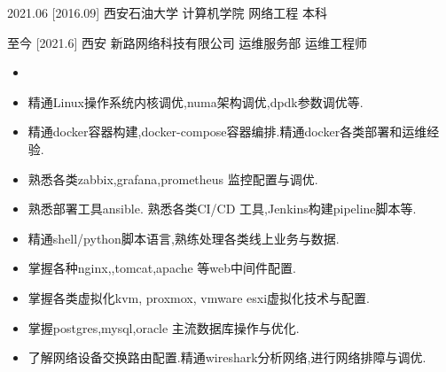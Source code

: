 \documentclass[zh]{resume}
\begin{document}
\begin{educations}
  \education%
    {2021.06}%
    [2016.09]%
    {西安石油大学}%
    {计算机学院}%
    {网络工程}%
    {本科}
\end{educations}
\begin{educations}
  \education%
    {至今}%
    [2021.6]%
    {西安}%
    {新路网络科技有限公司}%
    {运维服务部}%
    {运维工程师}
\end{educations}
\begin{itemize}
  \item {}
\end{itemize}
\begin{itemize}
  \item 精通Linux操作系统内核调优,numa架构调优,dpdk参数调优等.
  \item 精通docker容器构建,docker-compose容器编排.精通docker各类部署和运维经验.
  \item 熟悉各类zabbix,grafana,prometheus 监控配置与调优.
  \item 熟悉部署工具ansible. 熟悉各类CI/CD 工具,Jenkins构建pipeline脚本等.
  \item 精通shell/python脚本语言,熟练处理各类线上业务与数据.
  \item 掌握各种nginx,,tomcat,apache 等web中间件配置.
  \item 掌握各类虚拟化kvm, proxmox, vmware esxi虚拟化技术与配置.
  \item 掌握postgres,mysql,oracle 主流数据库操作与优化.
  \item 了解网络设备交换路由配置.精通wireshark分析网络,进行网络排障与调优.
\end{itemize}
\end{document}
